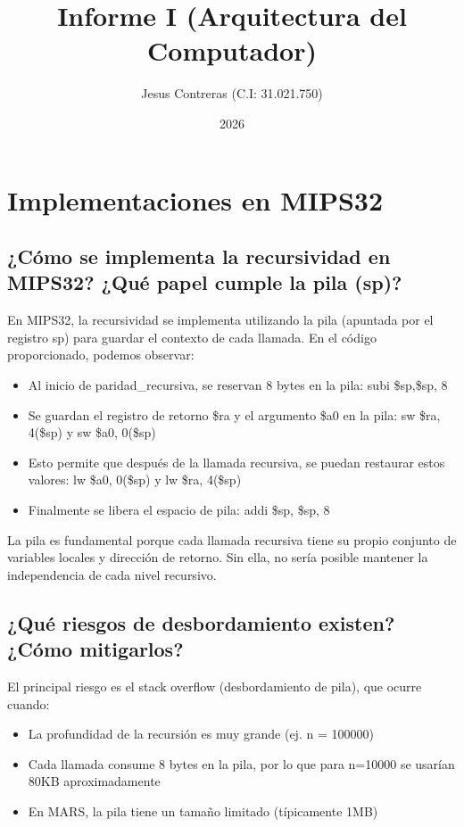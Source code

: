 \documentclass[12pt]{article}
\title{Informe I (Arquitectura del Computador)}
\author{Jesus Contreras (C.I: 31.021.750)}
\date{2026}
\begin{document}
	
	\maketitle
	
	\section{Implementaciones en MIPS32}
	

	\subsection{¿Cómo se implementa la recursividad en MIPS32? ¿Qué papel cumple la pila (sp)?}
	En MIPS32, la recursividad se implementa utilizando la pila (apuntada por el registro sp) para guardar el contexto de cada llamada. En el código proporcionado, podemos observar:
	
	\begin{itemize}
		\item Al inicio de paridad\_recursiva, se reservan 8 bytes en la pila: subi \$sp,\$sp, 8
		\item Se guardan el registro de retorno \$ra y el argumento \$a0 en la pila: sw \$ra, 4(\$sp) y sw \$a0, 0(\$sp)
		\item Esto permite que después de la llamada recursiva, se puedan restaurar estos valores: lw \$a0, 0(\$sp) y lw \$ra, 4(\$sp)
		\item Finalmente se libera el espacio de pila: addi \$sp, \$sp, 8
	\end{itemize}
	
	La pila es fundamental porque cada llamada recursiva tiene su propio conjunto de variables locales y dirección de retorno. Sin ella, no sería posible mantener la independencia de cada nivel recursivo.
	
	\subsection{¿Qué riesgos de desbordamiento existen? ¿Cómo mitigarlos?}
	El principal riesgo es el stack overflow (desbordamiento de pila), que ocurre cuando:
	\begin{itemize}
		\item La profundidad de la recursión es muy grande (ej. n = 100000)
		\item Cada llamada consume 8 bytes en la pila, por lo que para n=10000 se usarían 80KB aproximadamente
		\item En MARS, la pila tiene un tamaño limitado (típicamente 1MB)
	\end{itemize}
	
\end{document}
